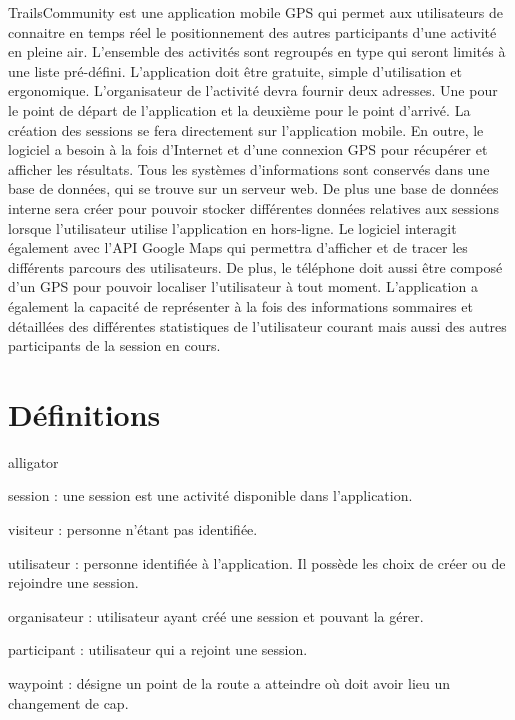 \documentclass[titlepage, 12pt]{report}
\begin{document}
TrailsCommunity est une application mobile GPS qui permet aux utilisateurs de connaitre en temps réel le positionnement des autres participants d'une activité en pleine air. L'ensemble des activités sont regroupés en type qui seront limités à une liste pré-défini.
L'application doit être gratuite, simple d'utilisation et ergonomique.
L'organisateur de l'activité devra fournir deux adresses. Une pour le point de départ de l'application et la deuxième pour le point d'arrivé. La création des sessions se fera directement sur l'application mobile.
En outre, le logiciel a besoin à la fois d'Internet et d'une connexion GPS pour récupérer et afficher les résultats. Tous les systèmes d'informations sont conservés dans une base de données, qui se trouve sur un serveur web. De plus une base de données interne sera créer pour pouvoir stocker différentes données relatives aux sessions lorsque l'utilisateur utilise l'application en hors-ligne.
Le logiciel interagit également avec l'API Google Maps qui permettra d'afficher et de tracer les différents parcours des utilisateurs. De plus, le téléphone doit aussi être composé d'un GPS pour pouvoir localiser l'utilisateur à tout moment. 
L'application a également la capacité de représenter à la fois des informations sommaires et détaillées des différentes statistiques de l'utilisateur courant mais aussi des autres participants de la session en cours.

\section{Définitions}
\begin{labeling}{alligator}
	\item [session] : une session est une activité disponible dans l’application.
	\item [visiteur] : personne n’étant pas identifiée.
	\item [utilisateur] : personne identifiée à l’application. Il possède les choix de créer ou de rejoindre une session.
	\item [organisateur] : utilisateur ayant créé une session et pouvant la gérer.
	\item [participant] : utilisateur qui a rejoint une session.
	\item [waypoint] : désigne un point de la route a atteindre où doit avoir lieu un changement de cap.
\end{labeling}
\end{document}
